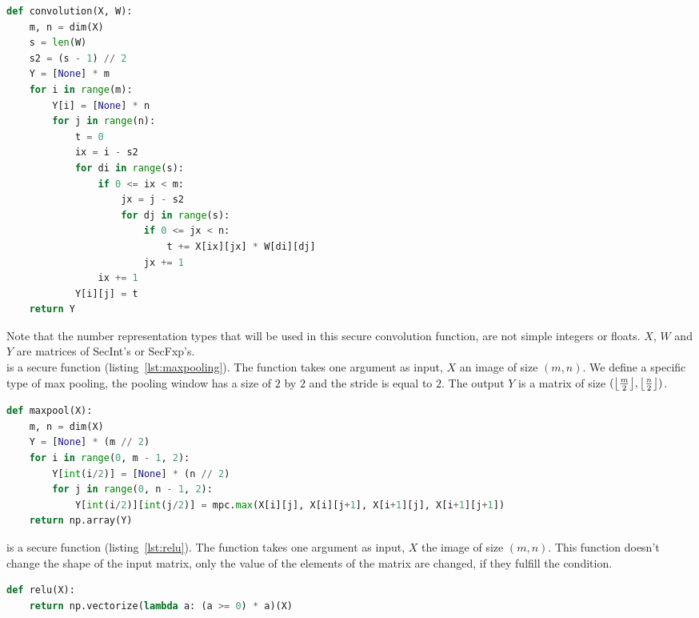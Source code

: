 \begin{lstlisting}[language=Python, caption={Secure convolution function}, label={lst:convolution}, frame=single, breaklines=true]
def convolution(X, W):
    m, n = dim(X)
    s = len(W)
    s2 = (s - 1) // 2
    Y = [None] * m
    for i in range(m):
        Y[i] = [None] * n
        for j in range(n):
            t = 0
            ix = i - s2
            for di in range(s):
                if 0 <= ix < m:
                    jx = j - s2
                    for dj in range(s):
                        if 0 <= jx < n:
                            t += X[ix][jx] * W[di][dj]
                        jx += 1
                ix += 1
            Y[i][j] = t
    return Y
\end{lstlisting}

Note that the number representation types that will be used in this secure convolution function, are not simple integers or floats. $X$, $W$ and $Y$ are matrices of SecInt's or SecFxp's.\\

 is a secure function (listing~\ref{lst:maxpooling}). The function takes one argument as input, $X$ an image of size $(m,n)$. We define a specific type of max pooling, the pooling window has a size of $2$ by $2$ and the stride is equal to $2$. The output $Y$ is a matrix of size $(\floor*{\frac{m}{2}}, \floor*{\frac{n}{2}})$.

\begin{lstlisting}[language=Python, caption={Secure max pooling function}, label={lst:maxpooling}, frame=single, breaklines=true]
def maxpool(X):
    m, n = dim(X)
    Y = [None] * (m // 2)
    for i in range(0, m - 1, 2):
        Y[int(i/2)] = [None] * (n // 2)
        for j in range(0, n - 1, 2):
            Y[int(i/2)][int(j/2)] = mpc.max(X[i][j], X[i][j+1], X[i+1][j], X[i+1][j+1])
    return np.array(Y)
\end{lstlisting}

 is a secure function (listing~\ref{lst:relu}). The function takes one argument as input, $X$ the image of size $(m,n)$. This function doesn't change the shape of the input matrix, only the value of the elements of the matrix are changed, if they fulfill the condition.

\begin{lstlisting}[language=Python, caption={Secure ReLU function}, label={lst:relu}, frame=single, breaklines=true]
def relu(X):
    return np.vectorize(lambda a: (a >= 0) * a)(X)
\end{lstlisting}

